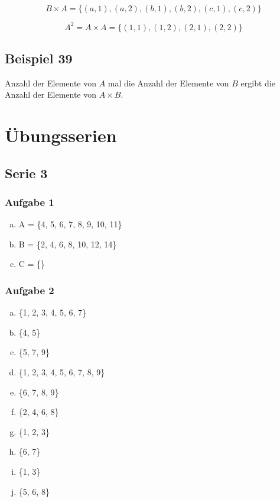 \documentclass[12pt, a4paper, oneside]{article}
\begin{document}
\begin{equation}
  B \times A = \{(a, 1), (a, 2), (b, 1), (b, 2), (c, 1), (c, 2)\}
\end{equation}

\begin{equation}
  A^{2} = A \times A = \{(1, 1), (1, 2), (2, 1), (2, 2)\}
\end{equation}

\subsection{Beispiel 39}
Anzahl der Elemente von $A$ mal die Anzahl der Elemente von $B$ ergibt die Anzahl der Elemente von $A \times B$.


\newpage
\section{Übungsserien}
\subsection{Serie 3}
\subsubsection{Aufgabe 1}
\begin{enumerate}[(a)]
  \item A = \{4, 5, 6, 7, 8, 9, 10, 11\}
  \item B = \{2, 4, 6, 8, 10, 12, 14\}
  \item C = \{\}
\end{enumerate}

\subsubsection{Aufgabe 2}
\begin{enumerate}[(a)]
  \item \{1, 2, 3, 4, 5, 6, 7\}
  \item \{4, 5\}
  \item \{5, 7, 9\}
  \item \{1, 2, 3, 4, 5, 6, 7, 8, 9\}
  \item \{6, 7, 8, 9\}
  \item \{2, 4, 6, 8\}
  \item \{1, 2, 3\}
  \item \{6, 7\}
  \item \{1, 3\}
  \item \{5, 6, 8\}
\end{enumerate}
\end{document}
